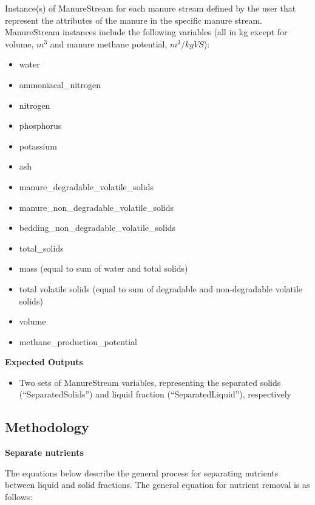 \begin{refsection}
Instance(s) of ManureStream for each manure stream defined by the user that represent the attributes of the manure in the specific manure stream. ManureStream instances include the following variables (all in kg except for volume, \(m^3\) and manure methane potential, \(m^3 / kgVS\)):
    \begin{itemize}
        \item water 
        \item ammoniacal\_nitrogen
        \item nitrogen 
        \item phosphorus
        \item potassium
        \item ash
        \item manure\_degradable\_volatile\_solids
        \item manure\_non\_degradable\_volatile\_solids
        \item bedding\_non\_degradable\_volatile\_solids
        \item total\_solids
        \item mass (equal to sum of water and total solids)
        \item total volatile solids (equal to sum of degradable and non-degradable volatile solids)
        \item volume
        \item methane\_production\_potential
    \end{itemize}
    \vspace{0.5cm}  

    \textbf{Expected Outputs}
    \vspace{ 0.25cm}

    \begin{itemize}
        \item Two sets of ManureStream variables, representing the separated solids (“SeparatedSolids”) and liquid fraction (“SeparatedLiquid”), respectively

    \end{itemize}
    \vspace{0.2cm}

\subsection{Methodology}


\textbf{Separate nutrients}
\vspace{ 0.25cm}

The equations below describe the general process for separating nutrients between liquid and solid fractions. The general equation for nutrient removal is as follows:
         \vspace{0.2cm}


\end{refsection}
